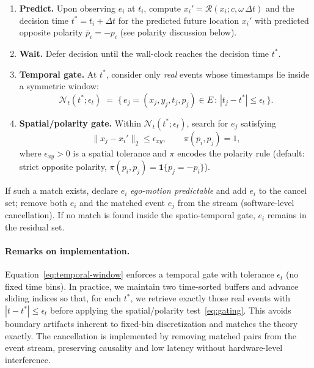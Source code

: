 \begin{enumerate}
  \item \textbf{Predict.} Upon observing $e_i$ at $t_i$, compute $x_i'=\mathcal{R}(x_i; c, \omega\,\Delta t)$ and the decision time $t^* = t_i + \Delta t$ for the predicted future location $x_i'$ with predicted opposite polarity $\bar p_i=-p_i$ (see polarity discussion below).
  \item \textbf{Wait.} Defer decision until the wall-clock reaches the decision time $t^*$.
  \item \textbf{Temporal gate.} At $t^*$, consider only \emph{real} events whose timestamps lie inside a symmetric window:
  \begin{equation}
  \mathcal{N}_t(t^*;\epsilon_t) \;=\; \{\, e_j=(x_j,y_j,t_j,p_j)\in E \,:\, |t_j - t^*| \le \epsilon_t \,\}.
  \label{eq:temporal-window}
  \end{equation}
  \item \textbf{Spatial/polarity gate.} Within $\mathcal{N}_t(t^*;\epsilon_t)$, search for $e_j$ satisfying
  \begin{equation}
  \|x_j - x_i'\|_2 \le \epsilon_{xy},
  \qquad
  \pi(p_i,p_j)=1,
  \label{eq:gating}
  \end{equation}
  where $\epsilon_{xy}>0$ is a spatial tolerance and $\pi$ encodes the polarity rule (default: strict opposite polarity, $\pi(p_i,p_j)=\mathbf{1}\{p_j=-p_i\}$).
\end{enumerate}

If such a match exists, declare $e_i$ \emph{ego-motion predictable} and add $e_i$ to the cancel set; remove both $e_i$ and the matched event $e_j$ from the stream (software-level cancellation). If no match is found inside the spatio-temporal gate, $e_i$ remains in the residual set.

\paragraph{Remarks on implementation.}
Equation~\eqref{eq:temporal-window} enforces a temporal gate with tolerance $\epsilon_t$ (no fixed time bins). In practice, we maintain two time-sorted buffers and advance sliding indices so that, for each $t^*$, we retrieve exactly those real events with $|t - t^*| \le \epsilon_t$ before applying the spatial/polarity test~\eqref{eq:gating}. This avoids boundary artifacts inherent to fixed-bin discretization and matches the theory exactly. The cancellation is implemented by removing matched pairs from the event stream, preserving causality and low latency without hardware-level interference.

